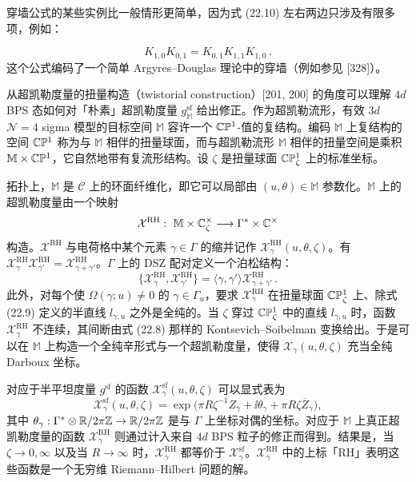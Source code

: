 \begin{example}[22.14]
穿墙公式的某些实例比一般情形更简单，因为式 (22.10) 左右两边只涉及有限多项，例如：
\end{example}

\[
K_{1,0}K_{0,1}=K_{0,1}K_{1,1}K_{1,0}\,.
\]
这个公式编码了一个简单 Argyres–Douglas 理论中的穿墙（例如参见 [328]）。

从超凯勒度量的扭量构造（twistorial construction）[201, 200] 的角度可以理解 $4d$ BPS 态如何对「朴素」超凯勒度量 $g^{\mathrm{sf}}_{\mathbb{M}}$ 给出修正。作为超凯勒流形，有效 $3d$ $\mathcal{N}=4$ sigma 模型的目标空间 $\mathbb{M}$ 容许一个 $\mathbb{C}\mathbb{P}^1$-值的复结构。编码 $\mathbb{M}$ 上复结构的空间 $\mathbb{C}\mathbb{P}^1$ 称为与 $\mathbb{M}$ 相伴的扭量球面，而与超凯勒流形 $\mathbb{M}$ 相伴的扭量空间是乘积 $\mathbb{M}\times\mathbb{C}\mathbb{P}^1$，它自然地带有复流形结构。设 $\zeta$ 是扭量球面 $\mathbb{C}\mathbb{P}^1_\zeta$ 上的标准坐标。

拓扑上，$\mathbb{M}$ 是 $\mathcal{C}$ 上的环面纤维化，即它可以局部由 $(u,\theta)\in\mathbb{M}$ 参数化。$\mathbb{M}$ 上的超凯勒度量由一个映射
\[
\mathcal{X}^{\mathrm{RH}}:\ \mathbb{M}\times\C^\times_\zeta\longrightarrow \Gamma^*\times\C^\times
\]
构造。$\mathcal{X}^{\mathrm{RH}}$ 与电荷格中某个元素 $\gamma\in\Gamma$ 的缩并记作 $\mathcal{X}^{\mathrm{RH}}_\gamma(u,\theta,\zeta)$。有 $\mathcal{X}^{\mathrm{RH}}_\gamma\mathcal{X}^{\mathrm{RH}}_{\gamma'}=\mathcal{X}^{\mathrm{RH}}_{\gamma+\gamma'}$。$\Gamma$ 上的 DSZ 配对定义一个泊松结构：
\[
\big\{\mathcal{X}^{\mathrm{RH}}_\gamma,\mathcal{X}^{\mathrm{RH}}_{\gamma'}\big\}=\langle\gamma,\gamma'\rangle\mathcal{X}^{\mathrm{RH}}_{\gamma+\gamma'}\,.
\]
此外，对每个使 $\Omega(\gamma;u)\ne0$ 的 $\gamma\in\Gamma_u$，要求 $\mathcal{X}^{\mathrm{RH}}_\gamma$ 在扭量球面 $\mathbb{C}\mathbb{P}^1_\zeta$ 上、除式 (22.9) 定义的半直线 $l_{\gamma,u}$ 之外是全纯的。当 $\zeta$ 穿过 $\mathbb{C}\mathbb{P}^1_\zeta$ 中的直线 $l_{\gamma,u}$ 时，函数 $\mathcal{X}^{\mathrm{RH}}_\gamma$ 不连续，其间断由式 (22.8) 那样的 Kontsevich–Soibelman 变换给出。于是可以在 $\mathbb{M}$ 上构造一个全纯辛形式与一个超凯勒度量，使得 $\mathcal{X}_\gamma(u,\theta,\zeta)$ 充当全纯 Darboux 坐标。

对应于半平坦度量 $g^{\mathrm{sf}}$ 的函数 $\mathcal{X}^{\mathrm{sf}}_\gamma(u,\theta,\zeta)$ 可以显式表为
\[
\mathcal{X}^{\mathrm{sf}}_\gamma(u,\theta,\zeta)=\exp\Big(\pi R\zeta^{-1}Z_\gamma+\ii\theta_\gamma+\pi R\zeta\overline{Z}_\gamma\Big),
\]
其中 $\theta_\gamma:\Gamma^*\otimes\mathbb{R}/2\pi\mathbb{Z}\to\mathbb{R}/2\pi\mathbb{Z}$ 是与 $\Gamma$ 上坐标对偶的坐标。对应于 $\mathbb{M}$ 上真正超凯勒度量的函数 $\mathcal{X}^{\mathrm{RH}}_\gamma$ 则通过计入来自 $4d$ BPS 粒子的修正而得到。结果是，当 $\zeta\to0,\infty$ 以及当 $R\to\infty$ 时，$\mathcal{X}^{\mathrm{RH}}_\gamma$ 都等价于 $\mathcal{X}^{\mathrm{sf}}_\gamma$。$\mathcal{X}^{\mathrm{RH}}_\gamma$ 中的上标「RH」表明这些函数是一个无穷维 Riemann–Hilbert 问题的解。


